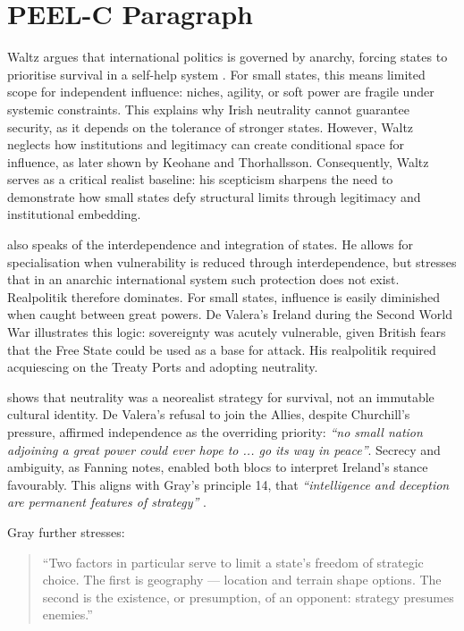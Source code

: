 \section*{PEEL-C Paragraph}
Waltz argues that international politics is governed by anarchy, forcing states to prioritise survival in a self-help system \parencite{WALTZ_1969}. For small states, this means limited scope for independent influence: niches, agility, or soft power are fragile under systemic constraints. This explains why Irish neutrality cannot guarantee security, as it depends on the tolerance of stronger states. However, Waltz neglects how institutions and legitimacy can create conditional space for influence, as later shown by Keohane and Thorhallsson. Consequently, Waltz serves as a critical realist baseline: his scepticism sharpens the need to demonstrate how small states defy structural limits through legitimacy and institutional embedding.

\parencite{WALTZ_1979} also speaks of the interdependence and integration of states. He allows for specialisation when vulnerability is reduced through interdependence, but stresses that in an anarchic international system such protection does not exist. Realpolitik therefore dominates. For small states, influence is easily diminished when caught between great powers. De Valera’s Ireland during the Second World War illustrates this logic: sovereignty was acutely vulnerable, given British fears that the Free State could be used as a base for attack. His realpolitik required acquiescing on the Treaty Ports and adopting neutrality. 

\textcite{FANNING_2015} shows that neutrality was a neorealist strategy for survival, not an immutable cultural identity. De Valera’s refusal to join the Allies, despite Churchill’s pressure, affirmed independence as the overriding priority: \textit{“no small nation adjoining a great power could ever hope to ... go its way in peace”}. Secrecy and ambiguity, as Fanning notes, enabled both blocs to interpret Ireland’s stance favourably. This aligns with Gray’s principle 14, that \textit{“intelligence and deception are permanent features of strategy”} \parencite{GRAY_2018}.

Gray further stresses:

\begin{quote}
	``Two factors in particular serve to limit a state's freedom of strategic choice. The first is geography — location and terrain shape options. The second is the existence, or presumption, of an opponent: strategy presumes enemies.'' \parencite{GRAY_2018}
\end{quote}

